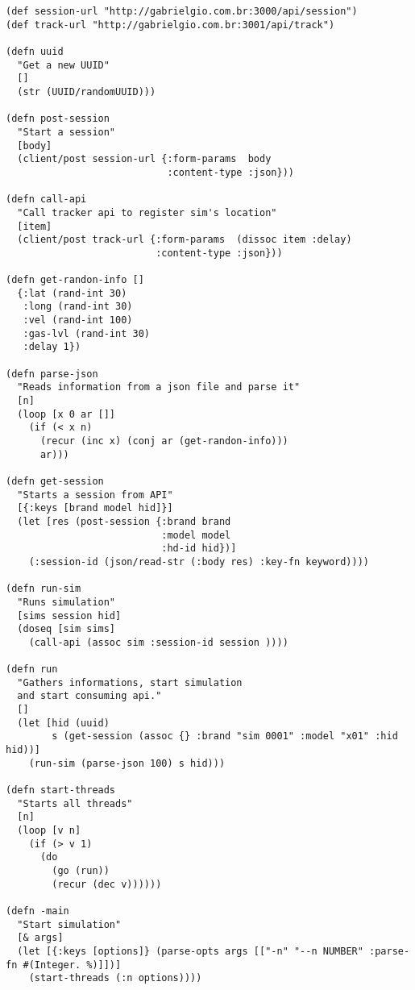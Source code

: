 \begin{apendicesenv}
\begin{lstlisting}
(def session-url "http://gabrielgio.com.br:3000/api/session")
(def track-url "http://gabrielgio.com.br:3001/api/track")

(defn uuid
  "Get a new UUID"
  []
  (str (UUID/randomUUID)))

(defn post-session
  "Start a session"
  [body]
  (client/post session-url {:form-params  body
                            :content-type :json}))

(defn call-api
  "Call tracker api to register sim's location"
  [item]
  (client/post track-url {:form-params  (dissoc item :delay)
                          :content-type :json}))

(defn get-randon-info []
  {:lat (rand-int 30)
   :long (rand-int 30)
   :vel (rand-int 100)
   :gas-lvl (rand-int 30)
   :delay 1})

(defn parse-json
  "Reads information from a json file and parse it"
  [n]
  (loop [x 0 ar []]
    (if (< x n)
      (recur (inc x) (conj ar (get-randon-info)))
      ar)))

(defn get-session
  "Starts a session from API"
  [{:keys [brand model hid]}]
  (let [res (post-session {:brand brand
                           :model model
                           :hd-id hid})]
    (:session-id (json/read-str (:body res) :key-fn keyword))))

(defn run-sim
  "Runs simulation"
  [sims session hid]
  (doseq [sim sims]
    (call-api (assoc sim :session-id session ))))

(defn run
  "Gathers informations, start simulation
  and start consuming api."
  []
  (let [hid (uuid)
        s (get-session (assoc {} :brand "sim 0001" :model "x01" :hid hid))]
    (run-sim (parse-json 100) s hid)))

(defn start-threads
  "Starts all threads"
  [n]
  (loop [v n]
    (if (> v 1)
      (do
        (go (run))
        (recur (dec v))))))

(defn -main
  "Start simulation"
  [& args]
  (let [{:keys [options]} (parse-opts args [["-n" "--n NUMBER" :parse-fn #(Integer. %)]])]
    (start-threads (:n options))))

\end{lstlisting}

\end{apendicesenv}